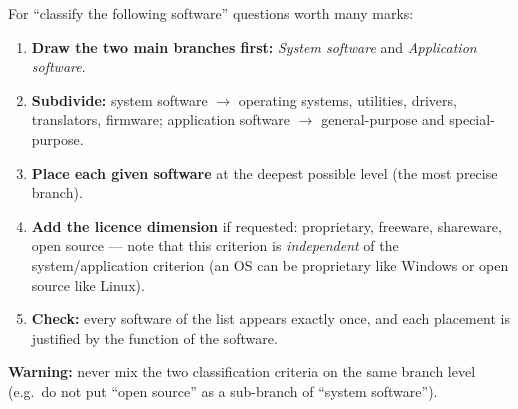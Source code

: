 \documentclass[11pt]{article}
\begin{document}
\begin{methode}
For ``classify the following software'' questions worth many marks:
\begin{enumerate}
\item \textbf{Draw the two main branches first:} \emph{System software} and \emph{Application software}.
\item \textbf{Subdivide:} system software $\to$ operating systems, utilities, drivers, translators, firmware; application software $\to$ general-purpose and special-purpose.
\item \textbf{Place each given software} at the deepest possible level (the most precise branch).
\item \textbf{Add the licence dimension} if requested: proprietary, freeware, shareware, open source --- note that this criterion is \emph{independent} of the system/application criterion (an OS can be proprietary like Windows or open source like Linux).
\item \textbf{Check:} every software of the list appears exactly once, and each placement is justified by the function of the software.
\end{enumerate}
\textbf{Warning:} never mix the two classification criteria on the same branch level (e.g.\ do not put ``open source'' as a sub-branch of ``system software'').
\end{methode}
\end{document}
